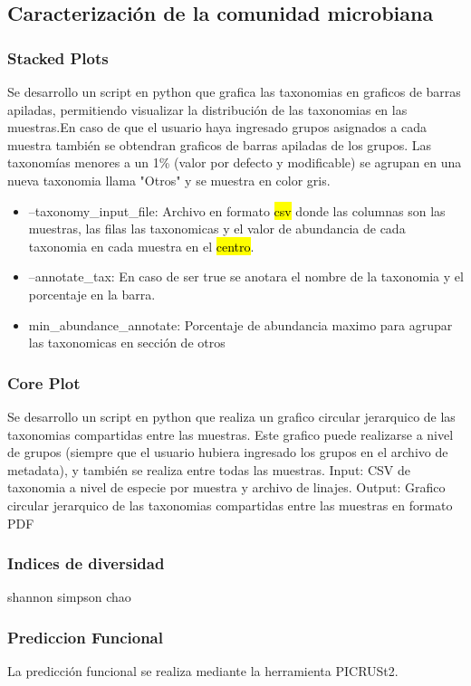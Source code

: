 \begin{itemize}
\subsection{Caracterización de la comunidad microbiana}
\subsubsection{Stacked Plots}
Se desarrollo un script en python que grafica las taxonomias en graficos de barras apiladas, permitiendo visualizar la distribución de las taxonomias en las muestras.En caso de que el usuario haya ingresado grupos asignados a cada muestra también se obtendran graficos de barras apiladas de los grupos. Las taxonomías menores a un 1\% (valor por defecto y modificable) se agrupan en una nueva taxonomia llama "Otros" y se muestra en color gris.

\begin{itemize}
    \item --taxonomy\_input\_file: Archivo en formato \hl{csv} donde las columnas son las muestras, las filas las taxonomicas y el valor de abundancia de cada taxonomia en cada muestra en el \hl{centro}.
    \item --annotate\_tax: En caso de ser true se anotara el nombre de la taxonomia y el porcentaje en la barra.
    \item min\_abundance\_annotate: Porcentaje de abundancia maximo para agrupar las taxonomicas en sección de otros
\end{itemize}

\subsubsection{Core Plot}
Se desarrollo un script en python que realiza un grafico circular jerarquico de las taxonomias compartidas entre las muestras.
Este grafico puede realizarse a nivel de grupos (siempre que el usuario hubiera ingresado los grupos en el archivo de metadata), y también se realiza entre todas las muestras.
Input: CSV de taxonomia a nivel de especie por muestra y archivo de linajes.
Output: Grafico circular jerarquico de las taxonomias compartidas entre las muestras en formato PDF
\subsubsection{Indices de diversidad}
shannon simpson chao

\subsubsection{Prediccion Funcional}
La predicción funcional se realiza mediante la herramienta PICRUSt2.


\end{itemize}
